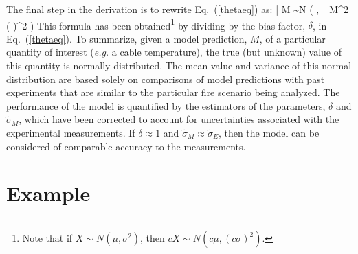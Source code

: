The final step in the derivation is to rewrite Eq.~(\ref{thetaeq}) as:
\be
   \theta \; | \; M \sim N \left(  \; , \; \widetilde{\sigma}_M^2 \left(  \right)^2 \right) \label{truth}
\ee
This formula has been obtained\footnote{Note that if $X \sim N(\mu,\sigma^2)$, then
$cX \sim N ( c \mu , (c \sigma)^2)$.} by dividing by the bias factor, $\delta$, in Eq.~(\ref{thetaeq}). To summarize, given a model prediction, $M$,
of a particular quantity of interest ({\em e.g.} a cable temperature), the true (but unknown) value of this quantity is normally distributed. The mean value
and variance of this normal distribution are based solely on comparisons of model predictions with past experiments that are similar to the particular fire
scenario being analyzed. The performance of the model is quantified by the estimators of the parameters, $\delta$ and $\widetilde{\sigma}_M$, which
have been corrected to account for uncertainties associated with the experimental measurements.
If $\delta \approx 1$ and $\widetilde{\sigma}_M \approx \widetilde{\sigma}_E$, then the
model can be considered of comparable accuracy to the measurements.


\section{Example}


